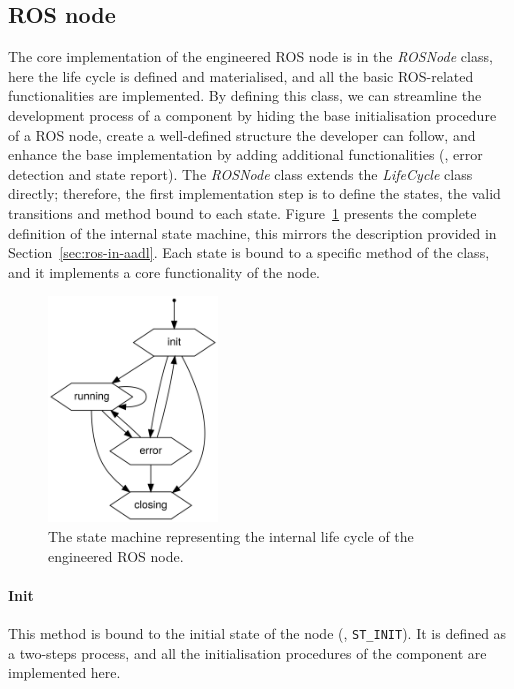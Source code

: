 \subsection{ROS node}
The core implementation of the engineered ROS node is in the \textit{ROSNode} class, here the life cycle is defined and materialised, and all the basic ROS-related functionalities are implemented. By defining this class, we can streamline the development process of a component by hiding the base initialisation procedure of a ROS node, create a well-defined structure the developer can follow, and enhance the base implementation by adding additional functionalities (\eg, error detection and state report). The \textit{ROSNode} class extends the \textit{LifeCycle} class directly; therefore, the first implementation step is to define the states, the valid transitions and method bound to each state. Figure~\ref{fig:state-machine} presents the complete definition of the internal state machine, this mirrors the description provided in Section~\ref{sec:ros-in-aadl}. Each state is bound to a specific method of the class, and it implements a core functionality of the node.

\begin{figure}[t]
    \centering
    \includegraphics[width=0.4\textwidth]{gfx/state_machine}
    \caption{The state machine representing the internal life cycle of the engineered ROS node.}\label{fig:state-machine}
\end{figure}

\paragraph{Init} This method is bound to the initial state of the node (\ie, \texttt{ST\_INIT}). It is defined as a two-steps process, and all the initialisation procedures of the component are implemented here.

